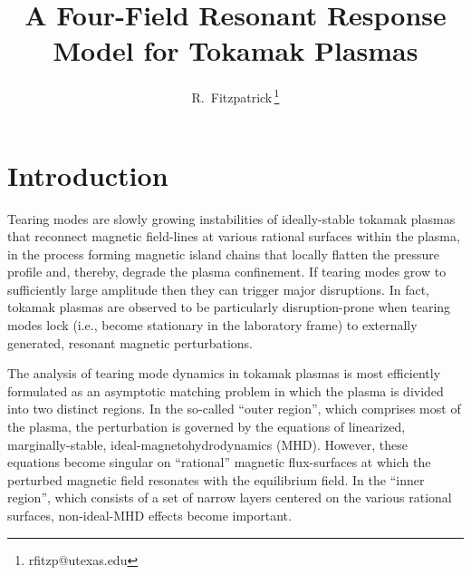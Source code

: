 \documentclass[12pt,prb,aps]{revtex4-1}
\begin{document}
\title{A Four-Field Resonant Response Model for Tokamak Plasmas}

\author{R.~Fitzpatrick\,\footnote{rfitzp@utexas.edu}}

\begin{abstract}

\end{abstract}

\maketitle

\section{Introduction}
Tearing modes are slowly growing instabilities of ideally-stable tokamak plasmas that reconnect magnetic field-lines
at various rational surfaces within the plasma, in the process forming magnetic island chains that locally flatten the pressure profile and, thereby, degrade the plasma confinement.\cite{wes}
If tearing modes grow to sufficiently large amplitude then they can trigger major disruptions.\cite{wes1}  In fact,  tokamak
plasmas are observed to be particularly disruption-prone when tearing modes lock (i.e., become stationary in the
laboratory frame) to externally generated, resonant magnetic perturbations.\cite{vries}  

The analysis  of tearing mode dynamics in tokamak plasmas is most efficiently formulated as an asymptotic matching problem in which the  plasma is  divided into two distinct regions.\cite{fkr}    In the so-called ``outer region'', which comprises most
of the plasma, the perturbation is governed by the equations of linearized, marginally-stable, ideal-magnetohydrodynamics (MHD).
However, these equations become singular on   ``rational'' magnetic flux-surfaces at which the perturbed magnetic field resonates with the equilibrium field. In the ``inner region'', which
consists of a set of narrow layers centered on the various rational surfaces, non-ideal-MHD effects   become important.
\end{document}
